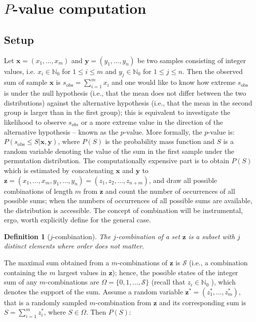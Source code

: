 \documentclass[a4paper]{article}
\newtheorem{mydef}{Definition}
\begin{document}
\section{$P$-value computation}
\label{sec:PvalueComputation}
\subsection{Setup}
Let $\bm{x}=(x_1,\ldots, x_m)$ and $\bm{y}=(y_1,\ldots,y_n)$ be two samples consisting of integer values, i.e. $x_i \in \mathbb{N}_0$ for $1\leq i \leq m$ and $y_j \in \mathbb{N}_0$ for $1\leq j\leq n$. Then the observed sum of sample $\bm{x}$ is $s_{\text{obs}} = \sum_{i=1}^m x_i$ and one would like to know how extreme $s_{\text{obs}}$ is under the null hypothesis (i.e., that the mean does not differ between the two distributions) against the alternative hypothesis (i.e., that the mean in the second group is larger than in the first group); this is equivalent to investigate the likelihood to observe $s_{obs}$ or a more extreme value in the direction of the alternative hypothesis – known as the $p$-value. More formally, the $p$-value is: $P(s_{\text{obs}} \leq S | \bm{x}, \bm{y})$, where $P(S)$ is the probability mass function and $S$ is a random variable denoting the value of the sum in the first sample under the permutation distribution. The computationally expensive part is to obtain $P(S)$ which is estimated by concatenating $\bm{x}$ and $\bm{y}$ to $\bm{z}=(x_{1},\ldots,x_{m},y_{1},\ldots,y_{n})=(z_1, z_2, \ldots, z_{n+m})$, and draw all possible combinations of length $m$ from $\bm{z}$ and count the number of occurrences of all possible sums; when the numbers of occurrences of all possible sums are available, the distribution is accessible. The concept of combination will be instrumental, ergo, worth explicitly define for the general case.

\begin{mydef}[$j$-combination] The $j$-combination of a set $\bm{z}$ is a subset with $j$ distinct elements where order does not matter.\end{mydef}

The maximal sum obtained from a $m$-combinations of $\bm{z}$ is $\mathcal{S}$ (i.e., a combination containing the $m$ largest values in $\bm{z}$); hence, the possible states of the integer sum of any $m$-combinations are $\Omega=\{0,1,\ldots,\mathcal{S}\}$ (recall that $z_{i}\in \mathbb{N}_0$ ), which denotes the support of the sum. Assume a random variable $\bm{z}^{*}=(z^{*}_1,\ldots,z^{*}_m)$, that is a randomly sampled $m$-combination from $\bm{z}$ and its corresponding sum is $S=\sum_{i=1}^m z^{*}_i$, where $S\in \Omega$. Then $P(S)$:
\end{document}
